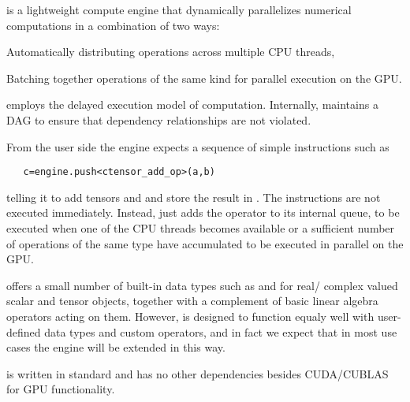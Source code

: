 \Cengine{} is a lightweight \cpp{} compute engine that dynamically parallelizes %
numerical computations in a combination of two ways: 
\begin{compactenum}[~~\m{\circ}]
\item Automatically distributing operations across multiple CPU threads, 
\item Batching together operations of the same kind for parallel execution on the GPU. 
\end{compactenum}
\Cengine{} employs the delayed execution model of computation. 
Internally,  \Cengine{} maintains a   
DAG to ensure that dependency relationships are not violated. 

From the user side the engine expects a sequence of simple instructions such as 

\texttt{~~~c=engine.push<ctensor\_add\_op>(a,b)}

telling it to add tensors  and  and store the result in . 
The instructions are not executed immediately. 
Instead, \Cengine{} just adds the  operator to its internal queue, to be executed 
when one of the CPU threads becomes 
available or a sufficient number of operations of the same type have accumulated to be executed in parallel 
on the GPU. %

\Cengine{} offers a small number of built-in data types such as  and  
for real/ complex valued scalar and tensor objects, together with a complement of basic linear algebra 
operators acting on them. However, is designed to function equaly well with user-defined data types and 
custom operators, and in fact we expect that in most use cases the engine will be extended in this way. 

\Cengine{} is written in standard \cppe{} and has no other dependencies besides CUDA/CUBLAS 
for GPU functionality.  

